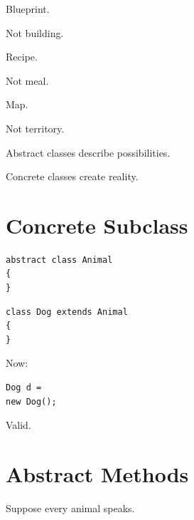 \documentclass[11pt,a4paper]{book}
\begin{document}
\begin{mentalmodel}

Blueprint.

Not building.

Recipe.

Not meal.

Map.

Not territory.

\end{mentalmodel}


Abstract classes describe possibilities.


Concrete classes create reality.


\section{Concrete Subclass}

\begin{verbatim}
abstract class Animal
{
}
\end{verbatim}


\begin{verbatim}
class Dog extends Animal
{
}
\end{verbatim}


Now:

\begin{verbatim}
Dog d =
new Dog();
\end{verbatim}


Valid.


\section{Abstract Methods}

Suppose every animal speaks.

\end{document}
